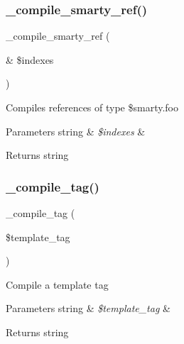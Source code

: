 \subsubsection{\texorpdfstring{\+\_\+compile\+\_\+smarty\+\_\+ref()}{\_compile\_smarty\_ref()}}
{\footnotesize\ttfamily \+\_\+compile\+\_\+smarty\+\_\+ref (\begin{DoxyParamCaption}\item[{\&}]{\$indexes }\end{DoxyParamCaption})}

Compiles references of type \$smarty.\+foo


\begin{DoxyParams}[1]{Parameters}
string & {\em \$indexes} & \\
\hline
\end{DoxyParams}
\begin{DoxyReturn}{Returns}
string 
\end{DoxyReturn}
\mbox{\label{class_smarty___compiler_a2a8edf6c0079fb0fa53d98837f17ff8c}} 
\subsubsection{\texorpdfstring{\+\_\+compile\+\_\+tag()}{\_compile\_tag()}}
{\footnotesize\ttfamily \+\_\+compile\+\_\+tag (\begin{DoxyParamCaption}\item[{}]{\$template\+\_\+tag }\end{DoxyParamCaption})}

Compile a template tag


\begin{DoxyParams}[1]{Parameters}
string & {\em \$template\+\_\+tag} & \\
\hline
\end{DoxyParams}
\begin{DoxyReturn}{Returns}
string 
\end{DoxyReturn}
\mbox{\label{class_smarty___compiler_ad242e9af4f6ee1524acdca2ee529f87a}} 
